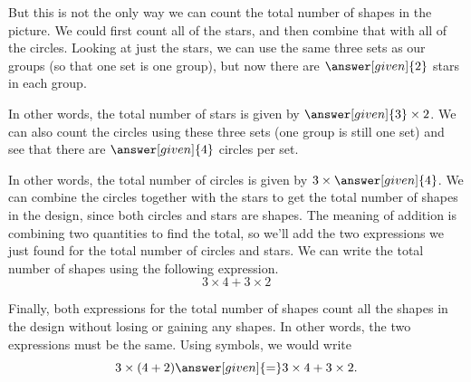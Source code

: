 \documentclass{ximera}
\begin{document}
\begin{example}
But this is not the only way we can count the total number of shapes in the picture. We could first count all of the stars, and then combine that with all of the circles. Looking at just the stars, we can use the same three sets as our groups (so that one set is one group), but now there are $\answer[given]{2}$ stars in each group.

\begin{image}
\end{image}
In other words, the total number of stars is given by $\answer[given]{3} \times 2$. We can also count the circles using these three sets (one group is still one set) and see that there are $\answer[given]{4}$ circles per set.

\begin{image}
\end{image}
In other words, the total number of circles is given by $3 \times \answer[given]{4}$. We can combine the circles together with the stars  to get the total number of shapes in the design, since both circles and stars are shapes. The meaning of addition is combining two quantities to find the total, so we'll add the two expressions we just found for the total number of circles and stars. We can write the total number of shapes using the following expression.
\[
3 \times 4 + 3 \times 2
\]

Finally, both expressions for the total number of shapes count all the shapes in the design without losing or gaining any shapes. In other words, the two expressions must be the same. Using symbols, we would write
\[
3 \times (4 + 2) \answer[given]{=} 3 \times 4 + 3 \times 2.
\]

\end{example}
\end{document}
